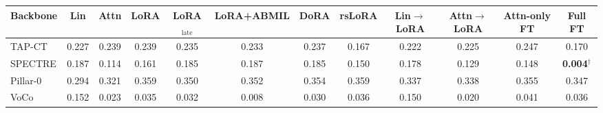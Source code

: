\setlength{\tabcolsep}{3pt}
\begin{tabular}{lccccccccccc}
\toprule
Backbone & Lin & Attn & LoRA & LoRA$_{\text{late}}$ & LoRA+ABMIL & DoRA & rsLoRA & Lin$\to$LoRA & Attn$\to$LoRA & Attn-only FT & Full FT \\
\midrule
TAP-CT & 0.227 & 0.239 & 0.239 & 0.235 & 0.233 & 0.237 & 0.167 & 0.222 & 0.225 & 0.247 & 0.170 \\
SPECTRE & 0.187 & 0.114 & 0.161 & 0.185 & 0.187 & 0.185 & 0.150 & 0.178 & 0.129 & 0.148 & \textbf{0.004}$^{\dagger}$ \\
Pillar-0 & 0.294 & 0.321 & 0.359 & 0.350 & 0.352 & 0.354 & 0.359 & 0.337 & 0.338 & 0.355 & 0.347 \\
VoCo & 0.152 & 0.023 & 0.035 & 0.032 & 0.008 & 0.030 & 0.036 & 0.150 & 0.020 & 0.041 & 0.036 \\
\bottomrule
\end{tabular}
